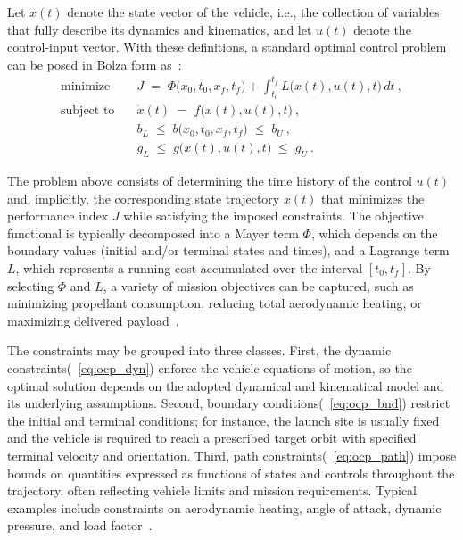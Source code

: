 Let $x(t)$ denote the state vector of the vehicle, i.e., the collection of variables that fully describe its dynamics and kinematics, and let $u(t)$ denote the control-input vector. With these definitions, a standard optimal control problem can be posed in Bolza form as~\cite{Optimization_Review}:
\begin{subequations}\label{eq:ocp}
\begin{align}
\text{minimize} \quad 
& J \;=\; \Phi\!\bigl(x_0,t_0,x_f,t_f\bigr)
+ \int_{t_0}^{t_f} L\!\bigl(x(t),u(t),t\bigr)\,dt \ ,
\label{eq:ocp_obj} \\[2mm]
\text{subject to}\quad 
& \dot{x}(t) \;=\; f\!\bigl(x(t),u(t),t\bigr) \ ,
\label{eq:ocp_dyn} \\
& b_L \;\le\; b\!\bigl(x_0,t_0,x_f,t_f\bigr) \;\le\; b_U \ ,
\label{eq:ocp_bnd} \\
& g_L \;\le\; g\!\bigl(x(t),u(t),t\bigr) \;\le\; g_U \ .
\label{eq:ocp_path}
\end{align}
\end{subequations}

The problem above consists of determining the time history of the control $u(t)$ and, implicitly, the corresponding state trajectory $x(t)$ that minimizes the performance index $J$ while satisfying the imposed constraints. The objective functional is typically decomposed into a Mayer term $\Phi$, which depends on the boundary values (initial and/or terminal states and times), and a Lagrange term $L$, which represents a running cost accumulated over the interval $[t_0,t_f]$. By selecting $\Phi$ and $L$, a variety of mission objectives can be captured, such as minimizing propellant consumption, reducing total aerodynamic heating, or maximizing delivered payload~\cite{300years}.

The constraints may be grouped into three classes. First, the dynamic constraints(~\ref{eq:ocp_dyn}) enforce the vehicle equations of motion, so the optimal solution depends on the adopted dynamical and kinematical model and its underlying assumptions. Second, boundary conditions(~\ref{eq:ocp_bnd}) restrict the initial and terminal conditions; for instance, the launch site is usually fixed and the vehicle is required to reach a prescribed target orbit with specified terminal velocity and orientation. Third, path constraints(~\ref{eq:ocp_path}) impose bounds on quantities expressed as functions of states and controls throughout the trajectory, often reflecting vehicle limits and mission requirements. Typical examples include constraints on aerodynamic heating, angle of attack, dynamic pressure, and load factor~\cite{Cremaschi2013TrajectoryOptimization}.

